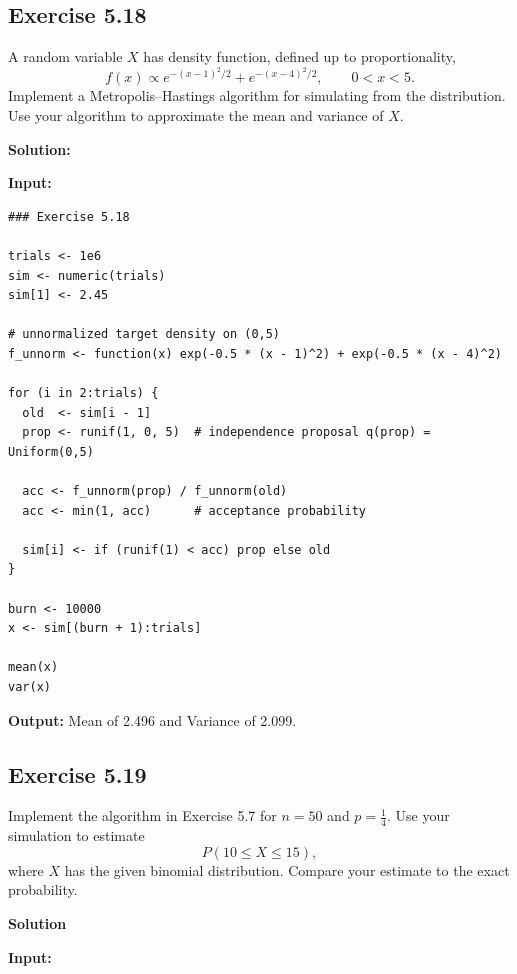 \documentclass[hidelinks]{article}
\begin{document}
\subsection{Exercise 5.18}

\noindent A random variable $X$ has density function, defined up to proportionality,
\[
f(x) \propto e^{-(x-1)^2/2} + e^{-(x-4)^2/2}, \qquad 0 < x < 5.
\]
Implement a Metropolis--Hastings algorithm for simulating from the distribution.
Use your algorithm to approximate the mean and variance of $X$.



\noindent \textbf{Solution:}

\noindent \textbf{Input:}

\begin{lstlisting}[caption={Metropolis-Hastings algorithm}]
### Exercise 5.18

trials <- 1e6
sim <- numeric(trials)
sim[1] <- 2.45

# unnormalized target density on (0,5)
f_unnorm <- function(x) exp(-0.5 * (x - 1)^2) + exp(-0.5 * (x - 4)^2)

for (i in 2:trials) {
  old  <- sim[i - 1]
  prop <- runif(1, 0, 5)  # independence proposal q(prop) = Uniform(0,5)
  
  acc <- f_unnorm(prop) / f_unnorm(old)
  acc <- min(1, acc)      # acceptance probability
  
  sim[i] <- if (runif(1) < acc) prop else old
}

burn <- 10000
x <- sim[(burn + 1):trials]

mean(x)
var(x)
\end{lstlisting}

\noindent \textbf{Output:} Mean of 2.496 and Variance of 2.099.

\noindent \subsection{Exercise 5.19}

\noindent Implement the algorithm in Exercise 5.7 for $n = 50$ and $p = \tfrac{1}{4}$. 
Use your simulation to estimate 
\[
P(10 \le X \le 15),
\]
where $X$ has the given binomial distribution. 
Compare your estimate to the exact probability.


\noindent \textbf{Solution}

\noindent \textbf{Input:}
\end{document}
